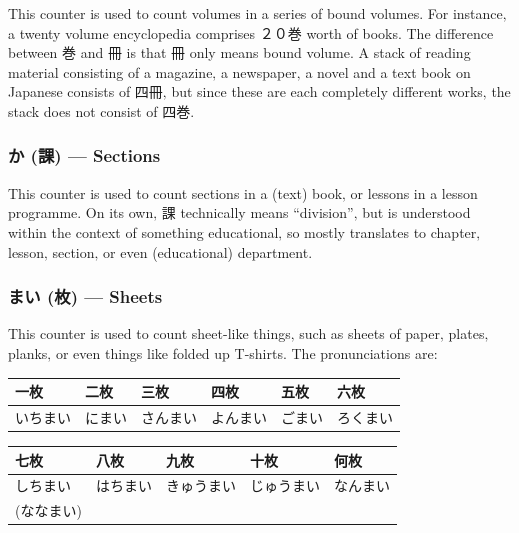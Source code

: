 \documentclass[11pt, b5paper, twoside, openright, onecolumn]{book}
\makeatletter
\newcommand*{\rubystack}[2]{{\relscale{0.5}%
  \begin{tabular}[b]{@{}c@{}}%
    {#1}\\%
   {\textscale{2}{#2}}%
  \end{tabular}}%
}
\DeclareRobustCommand*{\ruby}[2]{%
  \mbox{%
    \setlength{\parskip}{0ex}%
    \BeginAccSupp{method=pdfstringdef,ActualText={#1}}%
      \rubystack{\phantom{#2}}{#1}%
      \llap{%
        \rubystack{#2}{\phantom{#1}}%
      }%
    \EndAccSupp{}%
  }%
}
\renewcommand*{\ruby}[2]{#2 (#1)}%
\newenvironment{mytabular}[1]{\noindent\hspace{0.4in}
\begin{tabular}[h]{#1}}{\end{tabular}}
\makeatother
\begin{document}
This counter is used to count volumes in a series of bound volumes. For instance‚ a twenty volume encyclopedia comprises ２０巻 worth of books. The difference between 巻 and 冊 is that 冊 only means bound volume. A stack of reading material consisting of a magazine‚ a newspaper‚ a novel and a text book on Japanese consists of 四冊‚ but since these are each completely different works‚ the stack does not consist of 四巻.

\subsubsection{\ruby{課}{か} — Sections}

This counter is used to count sections in a (text) book‚ or lessons in a lesson programme. On its own‚ 課 technically means “division”‚ but is understood within the context of something educational‚ so mostly translates to chapter‚ lesson‚ section‚ or even (educational) department.

\subsubsection{\ruby{枚}{まい} — Sheets}

This counter is used to count sheet-like things‚ such as sheets of paper‚ plates‚ planks‚ or even things like folded up T-shirts. The pronunciations are:

\vspace{0.5cm}
\smaller
\begin{mytabular}{| l  l  l  l  l  l |}\hline 
\rule{0pt}{2.4ex}一枚 & 二枚 & 三枚 & 四枚 & 五枚 & 六枚\\ 
\hline
\rule{0pt}{2.4ex}いちまい & にまい & さんまい & よんまい & ごまい & ろくまい\\ 
\hline 
\end{mytabular}
\larger
\vspace{0.5cm}

\smaller
\begin{mytabular}{| l  l  l  l  l |}\hline 
\rule{0pt}{2.4ex}七枚 & 八枚 & 九枚 & 十枚 & 何枚\\ 
\hline
\rule{0pt}{2.4ex}しちまい & はちまい & きゅうまい & じゅうまい & なんまい\\ 
\rule{0pt}{2.4ex}(ななまい) &  &  &  & \\ 
\hline 
\end{mytabular}
\larger
\vspace{0.5cm}
\end{document}
